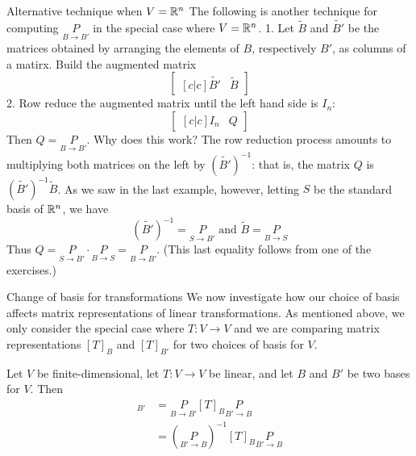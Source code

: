 \begin{frame}{Alternative technique when $V={\mathbb R}^n$}
The following is another technique for computing $\underset{B\rightarrow B'}{P}$ in the \alert{special case} where $V={\mathbb R}^n$. 
\bpause 
\alert{1.} Let $\widetilde{B}$ and $\widetilde{B'}$ be the matrices obtained by arranging the elements of $B$, respectively $B'$, as columns of a matirx.  Build the augmented matrix
\[
\begin{bmatrix}[c|c]
\widetilde{B'}& \widetilde{B}
\end{bmatrix} 
\]
\bpause
\alert{2.} Row reduce the augmented matrix until the left hand side is $I_n$:
\[
\begin{bmatrix}[c|c]
I_n& Q
\end{bmatrix} 
\]
Then $Q=\underset{B\rightarrow B'}{P}$. 
\bpause
Why does this work? 
\bpause The row reduction process amounts to multiplying both matrices on the left by $(\widetilde{B'})^{-1}$: that is, the matrix $Q$ is $(\widetilde{B'})^{-1}\widetilde{B}$. As we saw in the last example, however, letting $S$ be the \alert{standard basis} of ${\mathbb R}^n$, we have 
\[
(\widetilde{B'})^{-1}=\underset{S\rightarrow B'}{P} \text{ and } \widetilde{B}=\underset{B\rightarrow S}{P}
\]
Thus $Q=\underset{S \rightarrow B'}{P}\cdot \underset{B\rightarrow S}{P}=\underset{B\rightarrow B'}{P}$. (This last equality follows from one of the exercises.) 
\end{frame}
\begin{frame}{Change of basis for transformations}
We now investigate how our choice of basis affects matrix representations of linear transformations. As mentioned above, we only consider the special case where $T\colon V\rightarrow V$ and we are comparing matrix representations $[T]_B$ and $[T]_{B'}$ for two choices of basis for $V$. 
\pause
\begin{theorem}
\label{Th:changeofbasis}
Let $V$ be finite-dimensional, let $T\colon V\rightarrow V$ be linear, and let $B$ and $B'$ be two bases for $V$.
\pause Then 
\begin{align}
[T]_{B'}&=\underset{B\rightarrow B'}{P}[T]_B\underset{B'\rightarrow B}{P}\\
&=\left( \underset{B'\rightarrow B}{P}\right)^{-1}[T]_B\underset{B'\rightarrow B}{P}
\end{align}
\end{theorem}

\end{frame}
